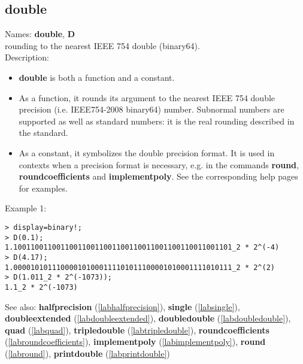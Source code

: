 \subsection{double}
\label{labdouble}
\noindent Names: \textbf{double}, \textbf{D}\\
rounding to the nearest IEEE 754 double (binary64).\\
\noindent Description: \begin{itemize}

\item \textbf{double} is both a function and a constant.

\item As a function, it rounds its argument to the nearest IEEE 754 double precision (i.e. IEEE754-2008 binary64) number.
   Subnormal numbers are supported as well as standard numbers: it is the real
   rounding described in the standard.

\item As a constant, it symbolizes the double precision format. It is used in 
   contexts when a precision format is necessary, e.g. in the commands 
   \textbf{round}, \textbf{roundcoefficients} and \textbf{implementpoly}.
   See the corresponding help pages for examples.
\end{itemize}
\noindent Example 1: 
\begin{center}\begin{minipage}{15cm}\begin{Verbatim}[frame=single]
> display=binary!;
> D(0.1);
1.100110011001100110011001100110011001100110011001101_2 * 2^(-4)
> D(4.17);
1.000010101110000101000111101011100001010001111010111_2 * 2^(2)
> D(1.011_2 * 2^(-1073));
1.1_2 * 2^(-1073)
\end{Verbatim}
\end{minipage}\end{center}
See also: \textbf{halfprecision} (\ref{labhalfprecision}), \textbf{single} (\ref{labsingle}), \textbf{doubleextended} (\ref{labdoubleextended}), \textbf{doubledouble} (\ref{labdoubledouble}), \textbf{quad} (\ref{labquad}), \textbf{tripledouble} (\ref{labtripledouble}), \textbf{roundcoefficients} (\ref{labroundcoefficients}), \textbf{implementpoly} (\ref{labimplementpoly}), \textbf{round} (\ref{labround}), \textbf{printdouble} (\ref{labprintdouble})
